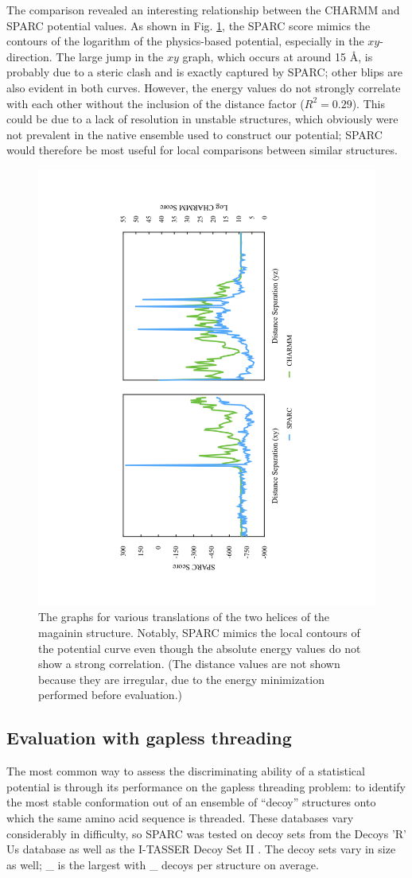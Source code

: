 \documentclass[11pt,titlepage]{article}
\begin{document}
The comparison revealed an interesting relationship between the CHARMM and SPARC potential values.
As shown in Fig. \ref{magainin_graphs}, the SPARC score mimics the contours of the logarithm of the physics-based potential, especially in the $xy$-direction.
The large jump in the $xy$ graph, which occurs at around 15 \AA, is probably due to a steric clash and is exactly captured by SPARC; other blips are also evident in both curves.
However, the energy values do not strongly correlate with each other without the inclusion of the distance factor ($R^2=0.29$). 
This could be due to a lack of resolution in unstable structures, which obviously were not prevalent in the native ensemble used to construct our potential; SPARC would therefore be most useful for local comparisons between similar structures.

\begin{figure}
	\includegraphics[height=0.9\textwidth, angle=-90, trim=5cm 0 5cm 3cm]{magainin_graphs}
	\caption{The graphs for various translations of the two helices of the magainin structure. Notably, SPARC mimics the local contours of the potential curve even though the absolute energy values do not show a strong correlation. (The distance values are not shown because they are irregular, due to the energy minimization performed before evaluation.)}
	\label{magainin_graphs}
\end{figure}

\subsection{Evaluation with gapless threading}
The most common way to assess the discriminating ability of a statistical potential is through its performance on the gapless threading problem: to identify the most stable conformation out of an ensemble of ``decoy'' structures onto which the same amino acid sequence is threaded.
These databases vary considerably in difficulty, so SPARC was tested on decoy sets from the Decoys 'R' Us database \cite{samudrala} as well as the I-TASSER Decoy Set II \cite{zhang}.
The decoy sets vary in size as well; \_ is the largest with \_ decoys per structure on average.
\end{document}
